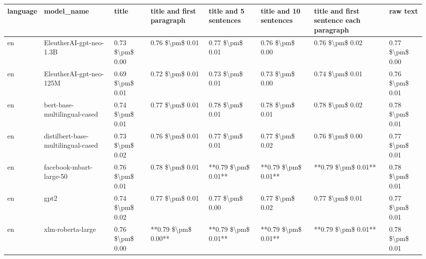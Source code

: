 \begin{tabular}{llllllll}
\toprule
language &                         model\_name &           title & title and first paragraph & title and 5 sentences & title and 10 sentences & title and first sentence each paragraph &            raw text \\
\midrule
      en &            EleutherAI-gpt-neo-1.3B & 0.73 \$\textbackslash pm\$ 0.00 &           0.76 \$\textbackslash pm\$ 0.01 &       0.77 \$\textbackslash pm\$ 0.01 &        0.76 \$\textbackslash pm\$ 0.00 &                         0.76 \$\textbackslash pm\$ 0.02 &     0.77 \$\textbackslash pm\$ 0.00 \\
      en &            EleutherAI-gpt-neo-125M & 0.69 \$\textbackslash pm\$ 0.01 &           0.72 \$\textbackslash pm\$ 0.01 &       0.73 \$\textbackslash pm\$ 0.01 &        0.73 \$\textbackslash pm\$ 0.00 &                         0.74 \$\textbackslash pm\$ 0.01 &     0.76 \$\textbackslash pm\$ 0.01 \\
      en &       bert-base-multilingual-cased & 0.74 \$\textbackslash pm\$ 0.01 &           0.77 \$\textbackslash pm\$ 0.01 &       0.78 \$\textbackslash pm\$ 0.01 &        0.78 \$\textbackslash pm\$ 0.01 &                         0.78 \$\textbackslash pm\$ 0.02 &     0.78 \$\textbackslash pm\$ 0.01 \\
      en & distilbert-base-multilingual-cased & 0.73 \$\textbackslash pm\$ 0.02 &           0.76 \$\textbackslash pm\$ 0.01 &       0.77 \$\textbackslash pm\$ 0.01 &        0.77 \$\textbackslash pm\$ 0.02 &                         0.76 \$\textbackslash pm\$ 0.00 &     0.77 \$\textbackslash pm\$ 0.01 \\
      en &            facebook-mbart-large-50 & 0.76 \$\textbackslash pm\$ 0.01 &           0.78 \$\textbackslash pm\$ 0.01 &   **0.79 \$\textbackslash pm\$ 0.01** &    **0.79 \$\textbackslash pm\$ 0.01** &                     **0.79 \$\textbackslash pm\$ 0.01** &     0.78 \$\textbackslash pm\$ 0.01 \\
      en &                               gpt2 & 0.74 \$\textbackslash pm\$ 0.02 &           0.77 \$\textbackslash pm\$ 0.01 &       0.77 \$\textbackslash pm\$ 0.00 &        0.77 \$\textbackslash pm\$ 0.02 &                         0.77 \$\textbackslash pm\$ 0.01 &     0.77 \$\textbackslash pm\$ 0.01 \\
      en &                  xlm-roberta-large & 0.76 \$\textbackslash pm\$ 0.00 &       **0.79 \$\textbackslash pm\$ 0.00** &   **0.79 \$\textbackslash pm\$ 0.01** &    **0.79 \$\textbackslash pm\$ 0.01** &                     **0.79 \$\textbackslash pm\$ 0.01** &     0.78 \$\textbackslash pm\$ 0.01 \\

\end{tabular}
